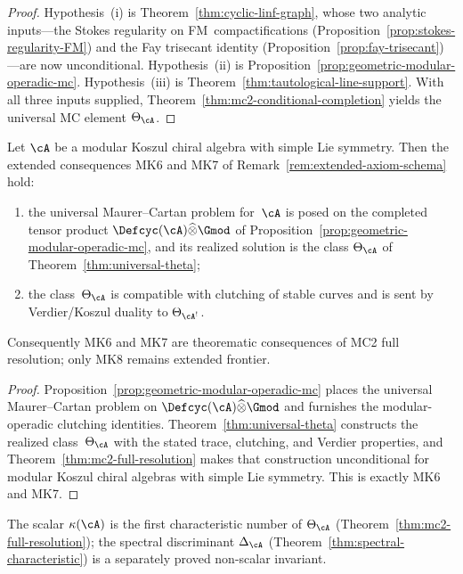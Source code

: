 \begin{proof}
Hypothesis~(i) is Theorem~\ref{thm:cyclic-linf-graph}, whose
two analytic inputs---the Stokes regularity on
FM~compactifications
(Proposition~\ref{prop:stokes-regularity-FM}) and the Fay
trisecant identity
(Proposition~\ref{prop:fay-trisecant})---are now
unconditional.  Hypothesis~(ii) is
Proposition~\ref{prop:geometric-modular-operadic-mc}.
Hypothesis~(iii) is
Theorem~\ref{thm:tautological-line-support}.
With all three inputs supplied,
Theorem~\ref{thm:mc2-conditional-completion} yields the
universal MC element $\Theta_{\cA}$.
\end{proof}

\begin{lemma}
\label{lem:mk67-from-mc2}
Let $\cA$ be a modular Koszul chiral algebra with simple Lie
symmetry.  Then the extended consequences MK6 and MK7 of
Remark~\ref{rem:extended-axiom-schema} hold:
\begin{enumerate}[label=\textup{(\roman*)}]
\item the universal Maurer--Cartan problem for~$\cA$ is posed on the
  completed tensor product
  $\Defcyc(\cA)\widehat{\otimes}\Gmod$ of
  Proposition~\ref{prop:geometric-modular-operadic-mc}, and its
  realized solution is the class
  $\Theta_{\cA}$ of Theorem~\ref{thm:universal-theta};
\item the class~$\Theta_{\cA}$ is compatible with clutching of stable
  curves and is sent by Verdier/Koszul duality to
  $\Theta_{\cA^!}$.
\end{enumerate}
Consequently MK6 and MK7 are theorematic consequences of MC2 full
resolution; only MK8 remains extended frontier.
\end{lemma}

\begin{proof}
Proposition~\ref{prop:geometric-modular-operadic-mc} places the
universal Maurer--Cartan problem on
$\Defcyc(\cA)\widehat{\otimes}\Gmod$ and furnishes the
modular-operadic clutching identities.  Theorem~\ref{thm:universal-theta}
constructs the realized class~$\Theta_{\cA}$ with the stated trace,
clutching, and Verdier properties, and
Theorem~\ref{thm:mc2-full-resolution} makes that construction
unconditional for modular Koszul chiral algebras with simple Lie
symmetry.  This is exactly MK6 and MK7.
\end{proof}

\begin{remark}
\label{rem:kappa-theta-relation}
The scalar $\kappa(\cA)$ is the first characteristic number of
$\Theta_{\cA}$ (Theorem~\ref{thm:mc2-full-resolution}); the
spectral discriminant $\Delta_{\cA}$
(Theorem~\ref{thm:spectral-characteristic}) is a separately proved
non-scalar invariant.
\end{remark}

